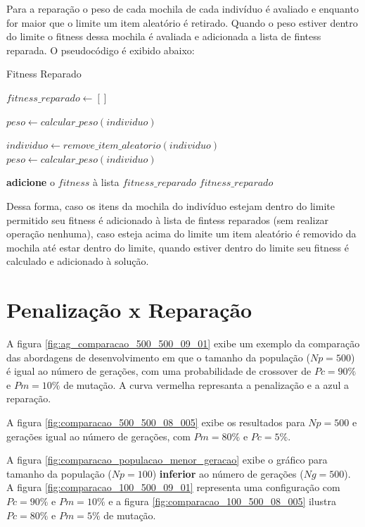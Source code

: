 \documentclass[11pt]{article}
\begin{document}
Para a reparação o peso de cada mochila de cada indivíduo é avaliado e enquanto for maior que o limite um item aleatório é retirado. Quando o peso estiver dentro do limite o fitness dessa mochila é avaliada e adicionada a lista de fintess reparada. O pseudocódigo é exibido abaixo: 


\begin{algorithm}
	\caption{Fitness Reparado}\label{euclid}
	\begin{algorithmic}[1]
		
			\State $fitness\_reparado \gets []$
			
				\State $peso \gets calcular\_peso(individuo)$
				
					\State $ individuo \gets remove\_item\_aleatorio(individuo) $
					\State $peso \gets calcular\_peso(individuo)$
				
				
				\State \textbf{adicione} o $fitness$ à lista $fitness\_reparado$
			\State \Return $fitness\_reparado$
		\EndFunction
	\end{algorithmic}
\end{algorithm}

Dessa forma, caso os itens da mochila do indivíduo estejam dentro do limite permitido seu fitness é adicionado à lista de fintess reparados (sem realizar operação nenhuma), caso esteja acima do limite um item aleatório é removido da mochila até estar dentro do limite, quando estiver dentro do limite seu fitness é calculado e adicionado à solução.

\section{Penalização x Reparação}

A figura \ref{fig:ag_comparacao_500_500_09_01} exibe um exemplo da comparação das abordagens de desenvolvimento em que o tamanho da população  ($Np = 500$) é igual ao número de gerações, com uma probabilidade de crossover de $Pc = 90\%$ e $Pm = 10\%$ de mutação. A curva vermelha represanta a penalização e a azul a reparação.

A figura \ref{fig:comparacao_500_500_08_005} exibe os resultados para $Np = 500$ e gerações igual ao número de gerações, com $ Pm = 80\% $ e $Pc = 5\%$.


A figura \ref{fig:comparacao_populacao_menor_geracao} exibe o gráfico para tamanho da população  ($Np = 100$) \textbf{inferior} ao número de gerações ($Ng = 500$). A figura \ref{fig:comparacao_100_500_09_01} representa uma configuração com $Pc = 90\%$ e $Pm = 10\% $ e a figura \ref{fig:comparacao_100_500_08_005} ilustra $Pc = 80\%$ e $ Pm = 5\%$ de mutação.
\end{document}
